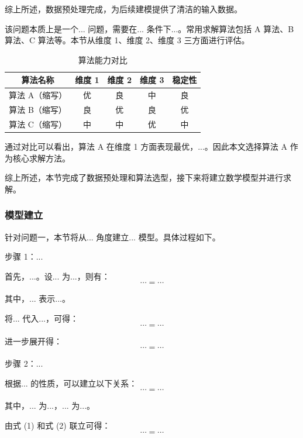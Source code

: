 综上所述，数据预处理完成，为后续建模提供了清洁的输入数据。

该问题本质上是一个... 问题，需要在... 条件下...。常用求解算法包括 A 算法、B 算法、C 算法等。本节从维度 1、维度 2、维度 3 三方面进行评估。

\begin{table}[htbp]
	\caption{算法能力对比}
	\centering
	\begin{tabular}{ccccc}
		\toprule
		算法名称 & 维度 1 & 维度 2 & 维度 3 & 稳定性 \\
		\midrule
		算法 A（缩写） & 优 & 良 & 中 & 良 \\
		算法 B（缩写） & 良 & 优 & 良 & 优 \\
		算法 C（缩写） & 中 & 中 & 优 & 中 \\
		\bottomrule
	\end{tabular}
\end{table}

通过对比可以看出，算法 A 在维度 1 方面表现最优，...。因此本文选择算法 A 作为核心求解方法。

综上所述，本节完成了数据预处理和算法选型，接下来将建立数学模型并进行求解。

\subsubsection{模型建立}

针对问题一，本节将从... 角度建立... 模型。具体过程如下。

步骤 1：...

首先，...。设... 为...，则有：
\begin{equation}
	\cdots = \cdots
\end{equation}

其中，... 表示...。

将... 代入...，可得：
\begin{equation}
	\cdots = \cdots
\end{equation}

进一步展开得：
\begin{equation}
	\cdots = \cdots
\end{equation}

步骤 2：...

根据... 的性质，可以建立以下关系：
\begin{equation}
	\cdots = \cdots
\end{equation}

其中，... 为...，... 为...。

由式 (1) 和式 (2) 联立可得：
\begin{equation}
	\cdots = \cdots
\end{equation}

